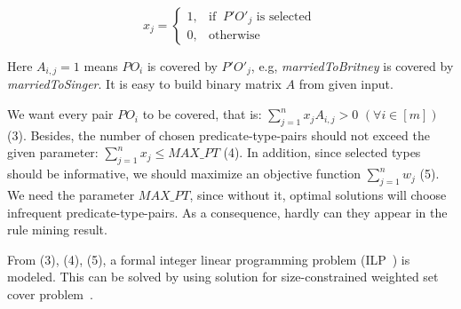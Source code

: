 \documentclass{acm_proc_article-sp}
\begin{document}
\begin{equation}
    x_{j} =
    \begin{cases}
      1, & \text{if }\ P'O'_{j} \text{ is selected}\ \\
      0, & \text{otherwise}
    \end{cases}
\end{equation}

Here $A_{i,j} = 1$ means $PO_{i}$ is covered by $P'O'_{j}$, e.g, \textit{marriedToBritney} is covered by \textit{marriedToSinger}. It is easy to build binary matrix $A$ from given input.

We want every pair $PO_{i}$ to be covered, that is: $\sum_{j=1}^{n}{x_{j} A_{i,j}} > 0$ $(\forall i \in [m])$ (3). Besides, the number of chosen predicate-type-pairs should not exceed the given parameter: $\sum_{j=1}^{n}{x_{j}} \leq MAX\_PT$ (4). In addition, since selected types should be informative, we should maximize an objective function $\sum_{j=1}^{n}{w_{j}}$ (5). We need the parameter $MAX\_PT$, since without it, optimal solutions will choose infrequent predicate-type-pairs. As a consequence, hardly can they appear in the rule mining result.

From (3), (4), (5), a formal integer linear programming problem (ILP~\cite{ref1}) is modeled. This can be solved by using solution for size-constrained weighted set cover problem~\cite{ref3}.



\end{document}
